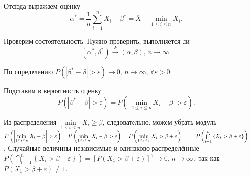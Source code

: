 Отсюда выражаем оценку
$$ \alpha^* =
  \frac{1}{n} \sum \limits_{i = 1}^n X_i - \beta^* =
  \overline{X} - \min \limits_{1 \leq i \leq n} X_i.$$

Проверим состоятельность.
Нужно проверить,
выполняется ли
$$ \left( \alpha^*, \beta^* \right) \overset{P}{ \to } \left( \alpha , \beta \right), \,
  n \to \infty.$$

По определению
$P \left( \left| \beta^* - \beta \right| > \varepsilon \right) \to 0, \,
  n \to \infty, \,
  \forall \varepsilon > 0$.

Подставим в вероятность оценку
$$P \left( \left| \beta^* - \beta \right| > \varepsilon \right) =
  P \left( \left| \min \limits_{1 \leq i \leq n} X_i - \beta \right| > \varepsilon \right).$$

Из распределения $ \min \limits_{1 \leq i \leq n} X_i \geq \beta $, следовательно,
можем убрать модуль
$P \left( \left| \min \limits_{1 \leq i \leq n} X_i - \beta \right| > \varepsilon \right) =
  P \left( \min \limits_{1 \leq i \leq n} X_i - \beta > \varepsilon \right) =
  P \left( \min \limits_{1 \leq i \leq n} X_i > \beta + \varepsilon \right) = \\
  = P \left( \bigcap \limits_{i = 1}^n \left\{ X_i > \beta + \varepsilon \right\} \right) $.
Случайные величины независимые и одинаково распределённые
$P \left( \bigcap \limits_{i = 1}^n \left\{ X_i > \beta + \varepsilon \right\} \right) =
  \left[ P \left( X_1 > \beta + \varepsilon \right) \right]^n \to 0, \,
  n \to \infty,$
так как $P \left( X_1 > \beta + \varepsilon \right) \neq 1$.

